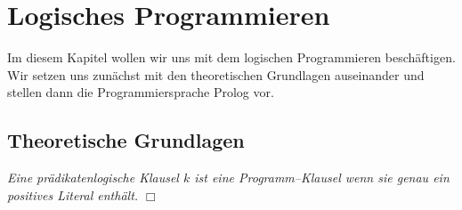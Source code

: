 \chapter{Logisches Programmieren} 
Im diesem Kapitel wollen wir uns mit dem logischen Programmieren besch\"{a}ftigen.
Wir setzen uns zun\"{a}chst mit den theoretischen Grundlagen auseinander und stellen dann
die Programmiersprache Prolog vor.

\section{Theoretische Grundlagen}
\begin{Definition}
{\em
    Eine pr\"{a}dikatenlogische Klausel $k$ ist eine \emph{Programm--Klausel} wenn sie
    genau ein positives Literal enth\"{a}lt.
} \hspace*{\fill} $\Box$
\end{Definition}

